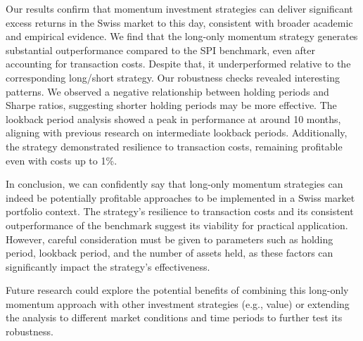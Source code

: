 \documentclass[a4paper,12pt]{article}
\begin{document}
    Our results confirm that momentum investment strategies can deliver significant excess returns in the Swiss market to this day, consistent with broader academic and empirical evidence. We find that the long-only momentum strategy generates substantial outperformance compared to the SPI benchmark, even after accounting for transaction costs. Despite that, it underperformed relative to the corresponding long/short strategy. Our robustness checks revealed interesting patterns. We observed a negative relationship between holding periods and Sharpe ratios, suggesting shorter holding periods may be more effective. The lookback period analysis showed a peak in performance at around 10 months, aligning with previous research on intermediate lookback periods. Additionally, the strategy demonstrated resilience to transaction costs, remaining profitable even with costs up to 1\%.
    
    In conclusion, we can confidently say that long-only momentum strategies can indeed be potentially profitable approaches to be implemented in a Swiss market portfolio context. The strategy's resilience to transaction costs and its consistent outperformance of the benchmark suggest its viability for practical application. However, careful consideration must be given to parameters such as holding period, lookback period, and the number of assets held, as these factors can significantly impact the strategy's effectiveness.
    
    Future research could explore the potential benefits of combining this long-only momentum approach with other investment strategies (e.g., value) or extending the analysis to different market conditions and time periods to further test its robustness.
    
    \newpage
    
    \printbibliography
    
\end{document}
